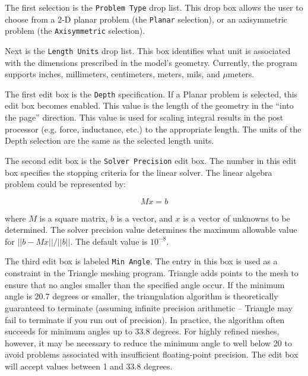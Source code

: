The first selection is the \texttt{Problem Type} drop list. This
drop box allows the user to choose from a 2-D planar problem (the
\texttt{Planar} selection), or an axisymmetric problem (the
\texttt{Axisymmetric} selection).





Next is the \texttt{Length Units} drop list. This box identifies
what unit is associated with the dimensions prescribed in the
model's geometry. Currently, the program supports inches,
millimeters, centimeters, meters, mils, and $\mu $meters.





The first edit box is the \texttt{Depth} specification. If a Planar
problem is selected, this edit box becomes enabled. This value is
the length of the geometry in the ``into the page'' direction. This
value is used for scaling integral results in the post processor
(e.g. force, inductance, etc.) to the appropriate length. The units
of the Depth selection are the same as the selected length units.

The second edit box is the \texttt{Solver Precision} edit box. The
number in this edit box specifies the stopping criteria for the
linear solver. The linear algebra problem could be represented by:

\begin{equation}
M x = b
\end{equation}

\noindent
where $M$ is a square matrix, $b$ is a vector, and $x$ is a vector of
unknowns to be determined. The solver precision value determines the maximum
allowable value for $\vert \vert b - Mx\vert \vert / \vert \vert b\vert
\vert $. The default value is $10^{ - 8}$.

The third edit box is labeled {\tt Min Angle}.  The entry in this box is used as a
constraint in the Triangle meshing program.  Triangle adds points to the mesh to
ensure that no angles smaller than the specified angle occur. If the minimum angle
is 20.7 degrees or smaller, the triangulation algorithm is theoretically guaranteed to
terminate (assuming infinite precision arithmetic -- Triangle may
fail to terminate if you run out of precision).  In practice, the
algorithm often succeeds for minimum angles up to 33.8 degrees.
For highly refined meshes, however, it may be necessary to reduce
the minimum angle to well below 20 to avoid problems associated
with insufficient floating-point precision.  The edit box will accept
values between 1 and 33.8 degrees.

